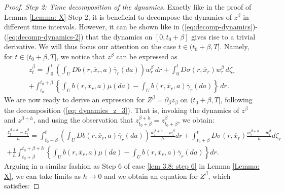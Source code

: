 \documentclass[12pt,reqno]{amsart}
\numberwithin{equation}{section}  %
\newcommand{\1}{{\bf 1}}
\newcommand{\2}{{\bf 2}}
\newcommand{\ga}{\gamma}
\newcommand{\lp}{\left(}
\newcommand{\rp}{\right)}
\theoremstyle{remark}
\theoremstyle{remark}
\begin{document}
\begin{proof}
\smallskip
\noindent
\textit{Step 2: Time decomposition of the dynamics.} Exactly like in the proof of Lemma \ref{Lemma: X}-Step 2, it is beneficial to decompose the dynamics of $z^{\beta}$ in different time intervals. However, it can be shown like in (\ref{eq:decomp-dynamics})-(\ref{eq:decomp-dynamics-2}) that the dynamics on $[0,t_{0}+\beta]$ gives rise to a trivial derivative. We will thus focus our attention on the case $t\in(t_{0}+\beta,T]$. 
 Namely, for $t\in (t_{0}+\beta,T]$, we notice that $z^{\beta}$ can be expressed as
\begin{multline}\label{eq: dynamics_z_3}
    z_{t}^{\beta}=\int_{0}^{t}\lp \int_{U}Db(r,\overline{x}_{r},a)\overline{\ga}_{r}(da)\rp w_{r}^{\beta}\,dr +\int_{0}^{t}D\sigma(r,\overline{x}_{r})w_{r}^{\beta}\,d\zeta_{r}\\ +
    \int_{t_{0}}^{t_{0}+\beta}\left\{\int_{U}b(r,\overline{x}_{r},a)\mu(da)-\int_{U}b(r,\overline{x}_{r},a)\overline{\ga}_{r}(da) \right\}\,dr.
\end{multline}
We are now ready to derive an expression for $Z^{\beta}=\partial_{\beta}z_{\beta}$ on $(t_{0}+\beta,T]$, following the decomposition (\ref{eq: dynamics_z_3}). 
\smallskip
\noindent
 That is, invoking the dynamics of $z^{\beta}$ and $z^{\beta+h}$, and using the observation that $z^{\beta+h}_{t_{0}+\beta}=z_{t_{0}+\beta}^{\beta}$, we obtain:
\begin{multline}
    \frac{z^{\beta+h}_{t}-z^{\beta}_{t}}{h}=\int_{t_{0}+\beta}^{t}\lp\int_{U}Db(r,\overline{x}_{r},a)\overline{\ga}_{r}(da) \rp \frac{w_{r}^{\beta +h}-w_{r}^{\beta}}{h}dr +\int_{t_{0}+\beta}^{t}D\sigma(r,\overline{x}_{r})\frac{w_{r}^{\beta+h}-w_{r}^{\beta}}{h}d\zeta_{r}\\
    +\frac{1}{h}\int_{t_{0}+\beta}^{t_{0}+\beta+h}\left\{\int_{U}b(r,\overline{x}_{r},a)\mu(da)-\int_{U}b(r,\overline{x}_{r},a)\overline{\ga}_{r}(da) \right\}dr.
\end{multline}
Arguing in a similar fashion as Step 6 of case \ref{lem 3.8: step 6} in Lemma \ref{Lemma: X}, we can take limits as $h\to 0$ and we obtain an equation for $Z^{\beta}$, which satisfies:


\end{proof}
\end{document}
